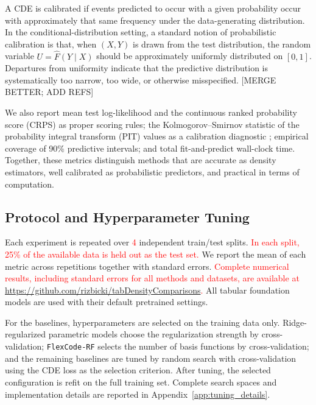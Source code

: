 \documentclass{article}
\newcommand{\method}[1]{\texttt{#1}}
\begin{document}
A CDE is calibrated if events predicted to occur with a given probability occur with approximately that same frequency under the data-generating distribution. In the conditional-distribution setting, a standard notion of probabilistic calibration is that, when $(X,Y)$ is drawn from the test distribution, the random variable $
U = \hat F(Y \mid X)$
should be approximately uniformly distributed on $[0,1]$. Departures from uniformity indicate that the predictive distribution is systematically too narrow, too wide, or otherwise misspecified.  [MERGE BETTER; ADD REFS]

We also report mean test log-likelihood and the continuous ranked probability
score (CRPS) \citep{gneiting2007strictly} as proper scoring rules; the
Kolmogorov--Smirnov statistic of the probability integral transform (PIT) values
as a calibration diagnostic \citep{zhao2021diagnostics}; empirical coverage  of 90\% predictive intervals; and total fit-and-predict wall-clock
time. Together, these metrics distinguish methods that are accurate as density
estimators, well calibrated as probabilistic predictors, and practical in terms
of computation.

\subsection{Protocol and Hyperparameter Tuning}
\label{sec:protocol}

Each experiment is repeated over \textcolor{red}{4} independent train/test splits. \textcolor{red}{In each split, 25\% of the available data is held out as the test set.} We report the
mean of each metric across repetitions together with standard errors. \textcolor{red}{Complete numerical results, including standard errors for all methods and datasets, are available at \url{https://github.com/rizbicki/tabDensityComparisons}.}
All
tabular foundation models are used with their default pretrained settings.

For the baselines, hyperparameters are selected on the training data only.
Ridge-regularized parametric models choose the regularization strength by
cross-validation; \method{FlexCode-RF} selects the number of basis functions by
cross-validation; and the remaining baselines are tuned by random search with
cross-validation using the CDE loss as the selection criterion. After tuning,
the selected configuration is refit on the full training set. Complete search
spaces and implementation details are reported in
Appendix~\ref{app:tuning_details}.
\end{document}
